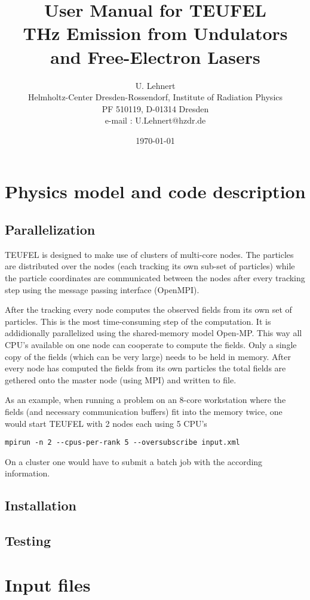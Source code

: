 \documentclass[11pt]{article}
\title{User Manual for TEUFEL \\ THz Emission from Undulators and Free-Electron Lasers}
\author{U. Lehnert\\
\footnotesize{Helmholtz-Center Dresden-Rossendorf, Institute of Radiation Physics}\\
\footnotesize{PF 510119, D-01314 Dresden}\\
\footnotesize{e-mail : U.Lehnert@hzdr.de}}
\date{\today\\[1cm]}
\begin{document}
\maketitle
\tableofcontents

\section{Physics model and code description}

\subsection{Parallelization}

TEUFEL is designed to make use of clusters of multi-core nodes. The particles are distributed over the nodes (each tracking its own sub-set of particles) while the particle coordinates are communicated between the nodes after every tracking step using the message passing interface (OpenMPI).

After the tracking every node computes the observed fields from its own set of particles. This is the most time-consuming step of the computation. It is addidionally parallelized using the shared-memory model Open-MP. This way all CPU's available on one node can cooperate to compute the fields. Only a single copy of the fields (which can be very large) needs to be held in memory. After every node has computed the fields from its own particles the total fields are gethered onto the master node (using MPI) and written to file.

As an example, when running a problem on an 8-core workstation where the fields (and necessary communication buffers) fit into the memory twice, one would start TEUFEL with 2 nodes each using 5 CPU's
\begin{lstlisting}
mpirun -n 2 --cpus-per-rank 5 --oversubscribe input.xml
\end{lstlisting}

On a cluster one would have to submit a batch job with the according information.

\subsection{Installation}

\subsection{Testing}

\section{Input files}
\end{document}
